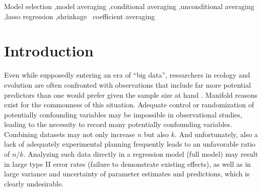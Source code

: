 \documentclass[5p]{elsarticle}
\newcommand{\bmb}[1]{{\color{blue} BB: #1}}
\begin{document}
\begin{frontmatter}
\begin{abstract}
\bmb{Reduced emphasis on p-values: I know that people care about these, but hopefully we can discuss them in the main text. Even the \emph{attempt} to quantify type I/II error distorts our understanding of statistical procedures, because it means that we have to simulate scenarios with effects of magnitude exactly zero. As much as possible I'd like to focus on coverage rather than type-I/II}

\bmb{Reduced emphasis on bias: measuring bias implies that we know the correct scale on which to estimate parameters (e.g. unbiased estimates for $\beta$ are biased for $\log(\beta)$, except asymptotically \ldots).  Should certainly cover it (as part of the set of bias/variance/RMSE/coverage/type-I/II), but I think it's less important/OK to de-emphasize in the abstract.}

\end{abstract}

\begin{keyword}
Model selection \sep model averaging \sep conditional averaging \sep unconditional averaging \sep lasso regression \sep shrinkage  \ coefficient averaging


\end{keyword}

\end{frontmatter}

\section{Introduction}

Even while supposedly entering an era of ``big data'', researchers in ecology and evolution are often confronted with observations that include far more potential predictors than one would prefer given the sample size at hand \citep[rules of thumb suggest at least 10 events $n$ per predictor variable $k$. See, e.g.,][]{Harrell-Regressionmodelingstrategies-2001}. Manifold reasons exist for the commonness of this situation. Adequate control or randomization of potentially confounding variables may be impossible in observational studies, leading to the necessity to record many potentially confounding variables. Combining datasets may not only increase $n$ but also $k$. And unfortunately, also a lack of adequately experimental planning frequently leads to an unfavorable ratio of $n/k$. Analyzing such data directly in a regression model (full model) may result in large type II error rates (failure to demonstrate existing effects), as well as in large variance and uncertainty of parameter estimates and predictions, which is clearly undesirable. 
\end{document}
